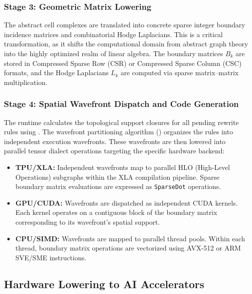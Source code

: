 \documentclass[manuscript, nonacm, review=false]{acmart}
\theoremstyle{definition}
\theoremstyle{plain}
\begin{document}
\subsubsection{Stage 3: Geometric Matrix Lowering}

The abstract cell complexes are translated into concrete sparse integer boundary incidence matrices and combinatorial Hodge Laplacians. This is a critical transformation, as it shifts the computational domain from abstract graph theory into the highly optimized realm of linear algebra. The boundary matrices $B_k$ are stored in Compressed Sparse Row (CSR) or Compressed Sparse Column (CSC) formats, and the Hodge Laplacians $L_k$ are computed via sparse matrix--matrix multiplication.

\subsubsection{Stage 4: Spatial Wavefront Dispatch and Code Generation}

The runtime calculates the topological support closures for all pending rewrite rules using . The wavefront partitioning algorithm () organizes the rules into independent execution wavefronts. These wavefronts are then lowered into parallel tensor dialect operations targeting the specific hardware backend:

\begin{itemize}
    \item \textbf{TPU/XLA:} Independent wavefronts map to parallel HLO (High-Level Operations) subgraphs within the XLA compilation pipeline. Sparse boundary matrix evaluations are expressed as \texttt{SparseDot} operations.
    
    \item \textbf{GPU/CUDA:} Wavefronts are dispatched as independent CUDA kernels. Each kernel operates on a contiguous block of the boundary matrix corresponding to its wavefront's spatial support.
    
    \item \textbf{CPU/SIMD:} Wavefronts are mapped to parallel thread pools. Within each thread, boundary matrix operations are vectorized using AVX-512 or ARM SVE/SME instructions.
\end{itemize}

\subsection{Hardware Lowering to AI Accelerators}
\label{subsec:hardware_lowering}
\end{document}
